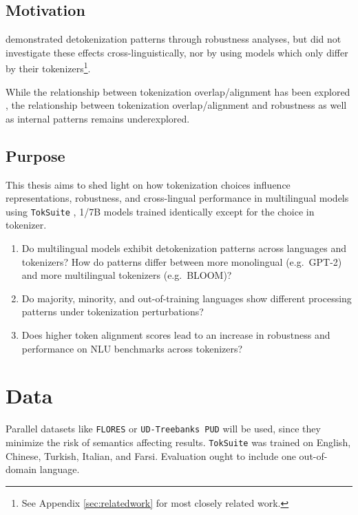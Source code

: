\documentclass[a4paper]{article}
\begin{document}
\subsection{Motivation}

\textcite{kaplan2025} demonstrated detokenization patterns through robustness analyses, but did not investigate these effects cross-linguistically, nor by using models which only differ by their tokenizers\footnote{See Appendix \ref{sec:relatedwork} for most closely related work.}.

While the relationship between tokenization overlap/alignment has been explored \parencite{kallini2025, hammerl2025, limisiewicz2023}, the relationship between tokenization overlap/alignment and robustness as well as internal patterns remains underexplored.

\subsection{Purpose}

This thesis aims to shed light on how tokenization choices influence representations, robustness, and cross-lingual performance in multilingual models using \texttt{TokSuite} \parencite{altintas2025}, 1/7B models trained identically except for the choice in tokenizer.

\begin{enumerate}[label=\textbf{RQ\arabic*}]

\item\label{rq1} Do multilingual models exhibit detokenization patterns across languages and tokenizers? How do patterns differ between more monolingual (e.g.\ GPT-2) and more multilingual tokenizers (e.g.\ BLOOM)?

\item\label{rq2} Do majority, minority, and out-of-training languages show different processing patterns under tokenization perturbations?

\item\label{rq3} Does higher token alignment scores lead to an increase in robustness and performance on NLU benchmarks across tokenizers?

\end{enumerate}

\section{Data}

Parallel datasets like \texttt{FLORES} \parencite{flores} or \texttt{UD-Treebanks PUD} \parencite{udtreebanks} will be used, since they minimize the risk of semantics affecting results. \texttt{TokSuite} was trained on English, Chinese, Turkish, Italian, and Farsi. Evaluation ought to include one out-of-domain language.
\end{document}
